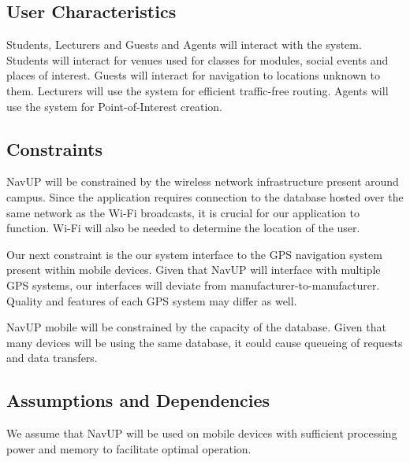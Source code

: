 ﻿\documentclass{article}
\begin{document}
    \subsection{User Characteristics}
        \begin{flushleft}
            Students, Lecturers and Guests and Agents will interact with the system.
            \break
            Students will interact for venues used for classes for modules, social events and places of interest.
            Guests will interact for navigation to locations unknown to them.
            Lecturers will use the system for efficient traffic-free routing.
            Agents will use the system for Point-of-Interest creation.
        \end{flushleft}
    \subsection{Constraints}
        \begin{flushleft}
        NavUP will be constrained by the wireless network infrastructure present around campus. Since the application requires connection to the database hosted over the same network as the Wi-Fi broadcasts, it is crucial for our application to function. Wi-Fi will also be needed to determine the location of the user.
        \end{flushleft}
        
        \begin{flushleft}
        Our next constraint is the our system interface to the GPS navigation system present within mobile devices. Given that NavUP will interface with multiple GPS systems, our interfaces will deviate from manufacturer-to-manufacturer. Quality and features of each GPS system may differ as well.
        \end{flushleft}
        
        \begin{flushleft}
        NavUP mobile will be constrained by the capacity of the database. Given that many devices will be using the same database, it could cause queueing of requests and data transfers.
        \end{flushleft}
        \subsection{Assumptions and Dependencies}
        
        \begin{flushleft}
        We assume that NavUP will be used on mobile devices with sufficient processing power and memory to facilitate optimal operation.
        \end{flushleft}
        
\end{document}
